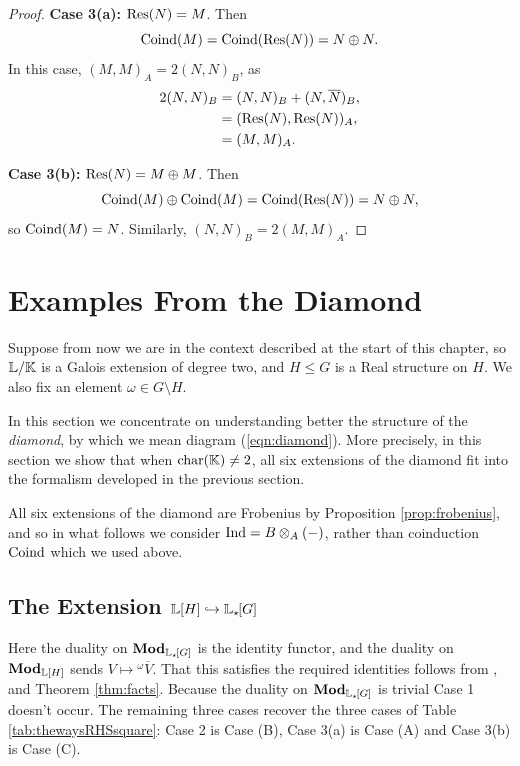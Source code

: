 \begin{proof}
\vspace{0.5em}
\textbf{Case 3(a):} $\Res(N) = M$. Then
\[
\Cnd(M) = \Cnd(\Res(N)) = N \oplus N.
\]
In this case, $(M,M)_A = 2 (N,N)_B$, as
\begin{align*}
    2(N,N)_B &= (N,N)_B + (N,\overline{N})_B, \\
    &= (\Res(N), \Res(N))_A, \\
    &= (M,M)_A.
\end{align*}

\vspace{0.5em}
\textbf{Case 3(b):} $\Res(N) = M \oplus M$. Then
\[
\Cnd(M) \oplus \Cnd(M) = \Cnd(\Res(N)) = N \oplus N,
\]
so $\operatorname{Coind}(M) = N$. Similarly, $(N,N)_B = 2 (M,M)_A$.
\end{proof}

\section{Examples From the Diamond}\label{sect:examplesfromdiamond} Suppose from now we are in the context described at the start of this chapter, so ${\mathbb L} / {\mathbb K}$ is a Galois extension of degree two, and $H \leq G$ is a Real structure on $H$. We also fix an element $\omega \in G \setminus H$.

In this section we concentrate on understanding better the structure of the \emph{diamond}, by which we mean diagram (\ref{eqn:diamond}). More precisely, in this section we show that when $\operatorname{char}({\mathbb K})\neq 2$, all six extensions of the diamond fit into the formalism developed in the previous section.

All six extensions of the diamond are Frobenius by Proposition \ref{prop:frobenius}, and so in what follows we consider $\operatorname{Ind} = B \otimes_A (-)$, rather than coinduction $\operatorname{Coind}$ which we used above.

\subsection{The Extension ${\mathbb L}[H] \hookrightarrow {\mathbb L}_{\star \hspace{-0.1em}}[G]$}

Here the duality on $\operatorname{\mathbf{Mod}}_{{\mathbb L}_{\star \hspace{-0.1em}}[G]}$ is the identity functor, and the duality on $\operatorname{\mathbf{Mod}}_{{\mathbb L}[H]}$ sends $V \mapsto {}^{\omega}\overline{V}$. That this satisfies the required identities follows from \cite[Cor.\ 8.5]{TAYSchur}, \cite[Prop.\ 8.17]{TAYSchur} and Theorem \ref{thm:facts}. Because the duality on $\operatorname{\mathbf{Mod}}_{{\mathbb L}_{\star \hspace{-0.1em}}[G]}$ is trivial Case 1 doesn't occur. The remaining three cases recover the three cases of Table \ref{tab:thewaysRHSsquare}: Case 2 is Case (B), Case 3(a) is Case (A) and Case 3(b) is Case (C).

